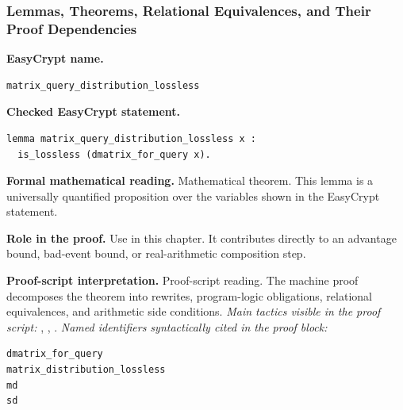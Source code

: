 \subsubsection*{Lemmas, Theorems, Relational Equivalences, and Their Proof Dependencies}
\begin{formaltheorem}
\noindent\textbf{EasyCrypt name.}
\begin{lstlisting}[language=EasyCrypt,basicstyle=\ttfamily\scriptsize]
matrix_query_distribution_lossless
\end{lstlisting}
\noindent\textbf{Checked EasyCrypt statement.}
\begin{lstlisting}[language=EasyCrypt,basicstyle=\ttfamily\scriptsize]
lemma matrix_query_distribution_lossless x :
  is_lossless (dmatrix_for_query x).
\end{lstlisting}
\noindent\textbf{Formal mathematical reading.}
Mathematical theorem. This lemma is a universally quantified proposition over the variables shown in the EasyCrypt statement.

\noindent\textbf{Role in the proof.}
Use in this chapter. It contributes directly to an advantage bound, bad-event bound, or real-arithmetic composition step.

\noindent\textbf{Proof-script interpretation.}
Proof-script reading. The machine proof decomposes the theorem into rewrites, program-logic obligations, relational equivalences, and arithmetic side conditions.
\emph{Main tactics visible in the proof script:} , , .
\emph{Named identifiers syntactically cited in the proof block:}
\begin{lstlisting}[language=EasyCrypt,basicstyle=\ttfamily\scriptsize]
dmatrix_for_query
matrix_distribution_lossless
md
sd
\end{lstlisting}

\end{formaltheorem}

